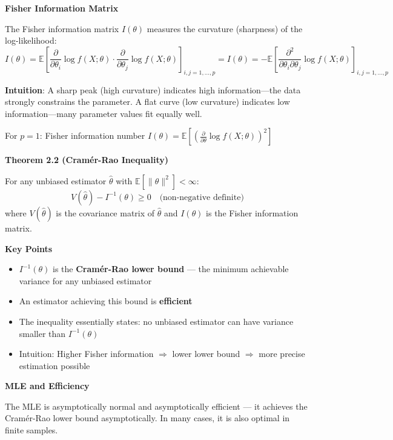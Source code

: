 \documentclass[12pt,a4paper]{article}
\begin{document}
\vspace{0.5em}

\textbf{Fisher Information Matrix}

The Fisher information matrix $I(\theta)$ measures the curvature (sharpness) of the log-likelihood:
\[
I(\theta) = \mathbb{E}\left[\frac{\partial}{\partial \theta_i} \log f(X; \theta) \cdot \frac{\partial}{\partial \theta_j} \log f(X; \theta)\right]_{i,j=1,\ldots,p}
= I(\theta) = -\mathbb{E}\left[\frac{\partial^2}{\partial \theta_i \partial \theta_j} \log f(X; \theta)\right]_{i,j=1,\ldots,p}
\]

\textbf{Intuition}: A sharp peak (high curvature) indicates high information—the data strongly constrains the parameter. A flat curve (low curvature) indicates low information—many parameter values fit equally well.

For $p=1$: Fisher information number $I(\theta) = \mathbb{E}\left[\left(\frac{\partial}{\partial \theta} \log f(X; \theta)\right)^2\right]$

\vspace{0.5em}

\textbf{Theorem 2.2 (Cramér-Rao Inequality)}

For any unbiased estimator $\hat{\theta}$ with $\mathbb{E}[\|\hat{\theta}\|^2] < \infty$:
\[
V(\hat{\theta}) - I^{-1}(\theta) \geq 0 \quad \text{(non-negative definite)}
\]
where $V(\hat{\theta})$ is the covariance matrix of $\hat{\theta}$ and $I(\theta)$ is the Fisher information matrix.

\textbf{Key Points}

\begin{itemize}
    \item $I^{-1}(\theta)$ is the \textbf{Cramér-Rao lower bound} — the minimum achievable variance for any unbiased estimator
    \item An estimator achieving this bound is \textbf{efficient}
    \item The inequality essentially states: no unbiased estimator can have variance smaller than $I^{-1}(\theta)$
    \item Intuition: Higher Fisher information $\Rightarrow$ lower lower bound $\Rightarrow$ more precise estimation possible
\end{itemize}

\textbf{MLE and Efficiency}

The MLE is asymptotically normal and asymptotically efficient — it achieves the Cramér-Rao lower bound asymptotically. In many cases, it is also optimal in finite samples.
\end{document}
